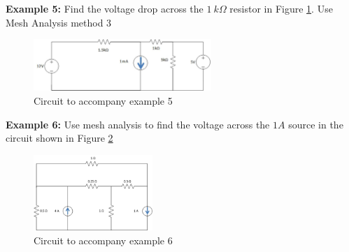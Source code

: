 \documentclass{handout}
\begin{document}
\textbf{Example 5:} Find the voltage drop across the $1\ k\Omega$ resistor in Figure \ref{fig: MeshAnalysisEx5}. Use Mesh Analysis method 3
\begin{figure} [h t b]
\centering
\includegraphics[width=0.6\textwidth]{Example5.jpg}
\caption{Circuit to accompany example 5}
\label{fig: MeshAnalysisEx5}
\end{figure}


\newpage
\clearpage
\pagebreak

\textbf{Example 6:} Use mesh analysis to find the voltage across the $1A$ source in the circuit shown in Figure \ref{fig: MeshAnalysisEx6}
\begin{figure} [h t b]
\centering
\includegraphics[width=0.4\textwidth]{Example6.jpg}
\caption{Circuit to accompany example 6}
\label{fig: MeshAnalysisEx6}
\end{figure}
\end{document}
